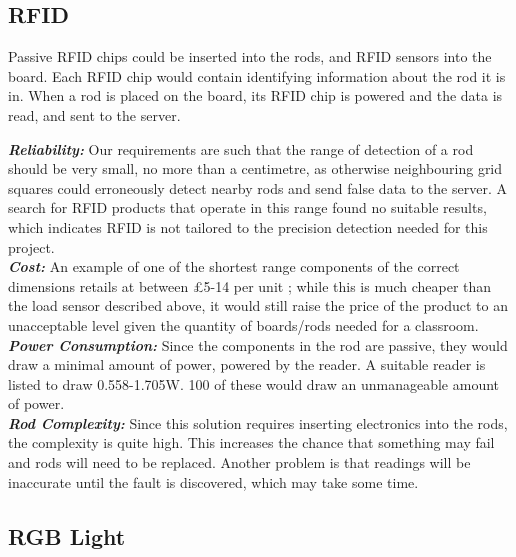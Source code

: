 \subsection{RFID}
\label{rfid}

Passive RFID chips could be inserted into the rods, and RFID sensors into the board. Each RFID chip would contain identifying information about the rod it is in. When a rod is placed on the board, its RFID chip is powered and the data is read, and sent to the server. \\

{
\setlength{\parindent}{0pt} 

\textbf{\textit{Reliability:}} Our requirements are such that the range of detection of a rod should be very small, no more than a centimetre, as otherwise neighbouring grid squares could erroneously detect nearby rods and send false data to the server. A search for RFID products that operate in this range found no suitable results, which indicates RFID is not tailored to the precision detection needed for this project.\\

\textbf{\textit{Cost:}} An example of one of the shortest range components of the correct dimensions retails at between £5-14 per unit \cite{RITRPR9U23:online}; while this is much cheaper than the load sensor described above, it would still raise the price of the product to an unacceptable level given the quantity of boards/rods needed for a classroom.\\

\textbf{\textit{Power Consumption:}} Since the components in the rod are passive, they would draw a minimal amount of power, powered by the reader. A suitable reader \cite{AS3991BQ49:online} is listed to draw 0.558-1.705W. 100 of these would draw an unmanageable amount of power. \\

\textbf{\textit{Rod Complexity:}} Since this solution requires inserting electronics into the rods, the complexity is quite high. This increases the chance that something may fail and rods will need to be replaced. Another problem is that readings will be inaccurate until the fault is discovered, which may take some time. \\
}



\subsection{RGB Light}
\label{rgb}

